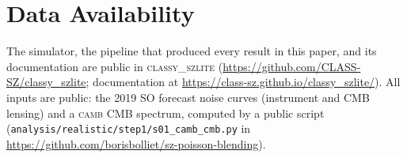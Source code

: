 \documentclass[fleqn,usenatbib]{mnras}
\newcommand{\classyszlite}{\textsc{classy\_szlite}}
\begin{document}
\section*{Data Availability}
The simulator, the pipeline that produced every result in this paper, and its documentation are public in
\classyszlite{} (\url{https://github.com/CLASS-SZ/classy_szlite}; documentation at
\url{https://class-sz.github.io/classy_szlite/}). All inputs are public: the 2019 SO forecast noise curves (instrument and CMB
lensing) and a \textsc{camb} CMB spectrum, computed by a public script
(\texttt{analysis/realistic/step1/s01\_camb\_cmb.py} in \url{https://github.com/borisbolliet/sz-poisson-blending}).




\appendix


\bsp
\label{lastpage}
\end{document}
